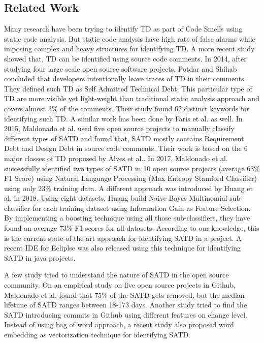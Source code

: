 \subsection{Related Work}
Many research have been trying to identify TD as part of Code Smells using static code analysis\cite{marinescu2010incode}\cite{marinescu2004detection}\cite{marinescu2012assessing}\cite{zazworka2013case}\cite{fontana2012investigating}. But static code analysis have high rate of false alarms while imposing complex and heavy structures for identifying TD\cite{tsantalis2011identification}\cite{tsantalis2015assessing}\cite{graf2010speeding}\cite{ali2012application}. A more recent study showed that, TD can be identified using source code comments. In 2014, after studying four large scale open source software projects, Potdar and Shihab concluded that developers intentionally leave traces of TD in their comments. They defined such TD as Self Admitted Technical Debt\cite{potdar2014exploratory}. This particular type of TD are more visible yet light-weight than traditional static analysis approach and covers almost 3\% of the comments. Their study found 62 distinct keywords for identifying such TD. A similar work has been done by Faris et al.\cite{de2015contextualized} as well. In 2015, Maldonado et al. used five open source projects to manually classify different types of SATD \cite{maldonado2015detecting} and found that, SATD mostly contains Requirement Debt and Design Debt in source code comments. Their work is based on the 6 major classes of TD proposed by Alves et al.\cite{alves2014towards}. In 2017, Maldonado et al. successfully identified two types of SATD in 10 open source projects (average 63\% F1 Score) using Natural Language Processing (Max Entropy Stamford Classifier) using only 23\% training data\cite{maldonado2017using}. A different approach was introduced by Huang et al. in 2018. Using eight datasets, Huang build Naive Bayes Multinomial sub-classifier for each training dataset using Information Gain as Feature Selection. By implementing a boosting technique using all those sub-classifiers, they have found an average 73\% F1 scores for all datasets\cite{huang2018identifying}. According to our knowledge, this is the current state-of-the-art approach for identifying SATD in a project. A recent IDE for Ecliplse was also released using this technique for identifying SATD in java projects\cite{liu2018satd}.

A few study tried to understand the nature of SATD in the open source community. On an empirical study on five open source projects in Github, Maldonado et al. found that 75\% of the SATD gets removed, but the median lifetime of SATD ranges between 18-173 days\cite{maldonado2017empirical}. Another study tried to find the SATD introducing commits in Github using different features on change level\cite{yan2018automating}. Instead of using bag of word approach, a recent study also proposed word embedding as vectorization technique for identifying SATD\cite{flisar2018enhanced}. 

